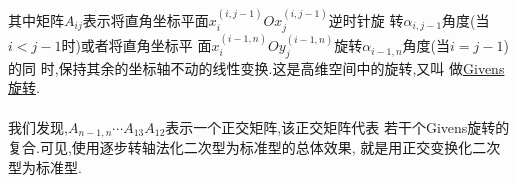 \documentclass[a4paper]{article}
\begin{document}
其中矩阵$A_{ij}$表示将直角坐标平面$x_i^{(i,j-1)}Ox_j^{(i,j-1)}$逆时针旋
转$\alpha_{i,j-1}$角度(当$i< j-1$时)或者将直角坐标平
面$x_i^{(i-1,n)}Oy_j^{(i-1,n)}$旋转$\alpha_{i-1,n}$角度(当$i=j-1$)的同
时,保持其余的坐标轴不动的线性变换.这是高维空间中的旋转,又叫
做\href{http://en.wikipedia.org/wiki/Givens_rotation}{Givens旋转}.\\\\

我们发现,$A_{n-1,n}\cdots A_{13}A_{12}$表示一个正交矩阵,该正交矩阵代表
若干个Givens旋转的复合.可见,使用逐步转轴法化二次型为标准型的总体效果,
就是用正交变换化二次型为标准型.
\end{document}

